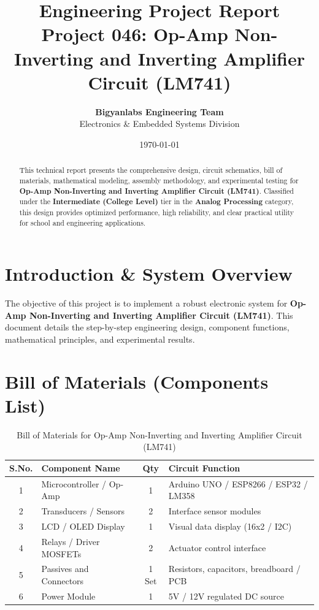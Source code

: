 \documentclass[11pt,a4paper]{article}
\title{\textbf{\Huge Engineering Project Report}\\[0.5em] \Large Project 046: Op-Amp Non-Inverting and Inverting Amplifier Circuit (LM741)}
\author{\textbf{Bigyanlabs Engineering Team}\\ Electronics \& Embedded Systems Division}
\date{\today}
\begin{document}
\maketitle
\thispagestyle{empty}

\begin{abstract}
This technical report presents the comprehensive design, circuit schematics, bill of materials, mathematical modeling, assembly methodology, and experimental testing for \textbf{Op-Amp Non-Inverting and Inverting Amplifier Circuit (LM741)}. Classified under the \textbf{Intermediate (College Level)} tier in the \textbf{Analog Processing} category, this design provides optimized performance, high reliability, and clear practical utility for school and engineering applications.
\end{abstract}

\newpage
\tableofcontents
\newpage

\section{Introduction \& System Overview}
The objective of this project is to implement a robust electronic system for \textbf{Op-Amp Non-Inverting and Inverting Amplifier Circuit (LM741)}. This document details the step-by-step engineering design, component functions, mathematical principles, and experimental results.

\section{Bill of Materials (Components List)}
\begin{table}[h!]
\centering
\caption{Bill of Materials for Op-Amp Non-Inverting and Inverting Amplifier Circuit (LM741)}
\vspace{0.5em}
\begin{tabular}{clcp{7cm}}
\toprule
\textbf{S.No.} & \textbf{Component Name} & \textbf{Qty} & \textbf{Circuit Function} \\
\midrule
1 & Microcontroller / Op-Amp & 1 & Arduino UNO / ESP8266 / ESP32 / LM358 \\
2 & Transducers / Sensors & 2 & Interface sensor modules \\
3 & LCD / OLED Display & 1 & Visual data display (16x2 / I2C) \\
4 & Relays / Driver MOSFETs & 2 & Actuator control interface \\
5 & Passives and Connectors & 1 Set & Resistors, capacitors, breadboard / PCB \\
6 & Power Module & 1 & 5V / 12V regulated DC source \\
\bottomrule
\end{tabular}
\end{table}
\end{document}
